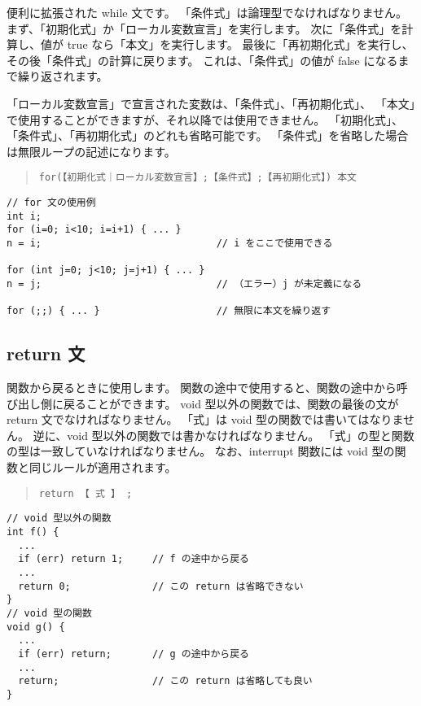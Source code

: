 便利に拡張された while 文です。
「条件式」は論理型でなければなりません。
まず、「初期化式」か「ローカル変数宣言」を実行します。
次に「条件式」を計算し、値が true なら「本文」を実行します。
最後に「再初期化式」を実行し、その後「条件式」の計算に戻ります。
これは、「条件式」の値が false になるまで繰り返されます。

「ローカル変数宣言」で宣言された変数は、「条件式」、「再初期化式」、
「本文」で使用することができますが、それ以降では使用できません。
「初期化式」、「条件式」、「再初期化式」のどれも省略可能です。
「条件式」を省略した場合は無限ループの記述になります。

\begin{quote}
\begin{verbatim}
for(【初期化式｜ローカル変数宣言】;【条件式】;【再初期化式】) 本文
\end{verbatim}
\end{quote}

\begin{mylist}
\begin{verbatim}
// for 文の使用例
int i;
for (i=0; i<10; i=i+1) { ... }
n = i;                              // i をここで使用できる

for (int j=0; j<10; j=j+1) { ... }
n = j;                              // （エラー）j が未定義になる

for (;;) { ... }                    // 無限に本文を繰り返す
\end{verbatim}
\end{mylist}

\subsection{return 文}

関数から戻るときに使用します。
関数の途中で使用すると、関数の途中から呼び出し側に戻ることができます。
void 型以外の関数では、関数の最後の文が return 文でなければなりません。
「式」は void 型の関数では書いてはなりません。
逆に、void 型以外の関数では書かなければなりません。
「式」の型と関数の型は一致していなければなりません。
なお、interrupt 関数には void 型の関数と同じルールが適用されます。

\begin{quote}
\begin{verbatim}
return 【 式 】 ;
\end{verbatim}
\end{quote}

\begin{mylist}
\begin{verbatim}
// void 型以外の関数
int f() {
  ...
  if (err) return 1;     // f の途中から戻る
  ...
  return 0;              // この return は省略できない
}
// void 型の関数
void g() {
  ...
  if (err) return;       // g の途中から戻る
  ...
  return;                // この return は省略しても良い
}
\end{verbatim}
\end{mylist}

